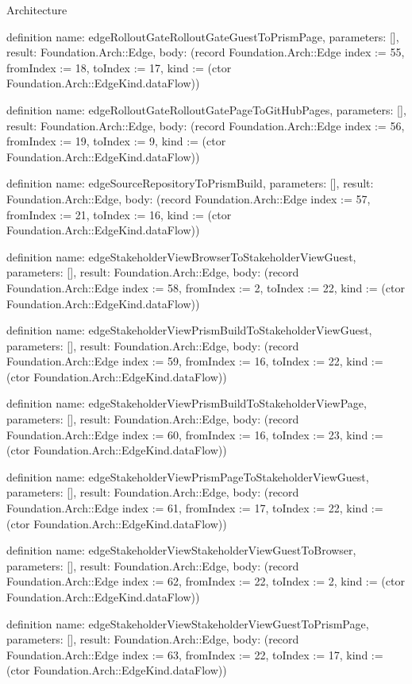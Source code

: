 \begin{lexlean}{Architecture}
\begin{semanticmodule}
definition{
  name: edgeRolloutGateRolloutGateGuestToPrismPage,
  parameters: [],
  result: Foundation.Arch::Edge,
  body: (record Foundation.Arch::Edge {index := 55, fromIndex := 18, toIndex := 17, kind := (ctor Foundation.Arch::EdgeKind.dataFlow)})
}

definition{
  name: edgeRolloutGateRolloutGatePageToGitHubPages,
  parameters: [],
  result: Foundation.Arch::Edge,
  body: (record Foundation.Arch::Edge {index := 56, fromIndex := 19, toIndex := 9, kind := (ctor Foundation.Arch::EdgeKind.dataFlow)})
}

definition{
  name: edgeSourceRepositoryToPrismBuild,
  parameters: [],
  result: Foundation.Arch::Edge,
  body: (record Foundation.Arch::Edge {index := 57, fromIndex := 21, toIndex := 16, kind := (ctor Foundation.Arch::EdgeKind.dataFlow)})
}

definition{
  name: edgeStakeholderViewBrowserToStakeholderViewGuest,
  parameters: [],
  result: Foundation.Arch::Edge,
  body: (record Foundation.Arch::Edge {index := 58, fromIndex := 2, toIndex := 22, kind := (ctor Foundation.Arch::EdgeKind.dataFlow)})
}

definition{
  name: edgeStakeholderViewPrismBuildToStakeholderViewGuest,
  parameters: [],
  result: Foundation.Arch::Edge,
  body: (record Foundation.Arch::Edge {index := 59, fromIndex := 16, toIndex := 22, kind := (ctor Foundation.Arch::EdgeKind.dataFlow)})
}

definition{
  name: edgeStakeholderViewPrismBuildToStakeholderViewPage,
  parameters: [],
  result: Foundation.Arch::Edge,
  body: (record Foundation.Arch::Edge {index := 60, fromIndex := 16, toIndex := 23, kind := (ctor Foundation.Arch::EdgeKind.dataFlow)})
}

definition{
  name: edgeStakeholderViewPrismPageToStakeholderViewGuest,
  parameters: [],
  result: Foundation.Arch::Edge,
  body: (record Foundation.Arch::Edge {index := 61, fromIndex := 17, toIndex := 22, kind := (ctor Foundation.Arch::EdgeKind.dataFlow)})
}

definition{
  name: edgeStakeholderViewStakeholderViewGuestToBrowser,
  parameters: [],
  result: Foundation.Arch::Edge,
  body: (record Foundation.Arch::Edge {index := 62, fromIndex := 22, toIndex := 2, kind := (ctor Foundation.Arch::EdgeKind.dataFlow)})
}

definition{
  name: edgeStakeholderViewStakeholderViewGuestToPrismPage,
  parameters: [],
  result: Foundation.Arch::Edge,
  body: (record Foundation.Arch::Edge {index := 63, fromIndex := 22, toIndex := 17, kind := (ctor Foundation.Arch::EdgeKind.dataFlow)})
}


\end{semanticmodule}
\end{lexlean}
